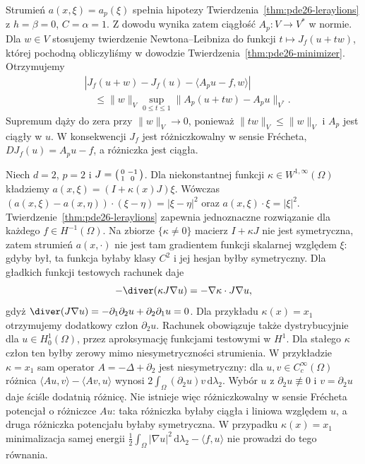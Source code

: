 \begin{uwaga}
Strumień $a(x,\xi)=a_p(\xi)$ spełnia hipotezy
Twierdzenia~\ref{thm:pde26-leraylions} z $h=\beta=0$,
$C=\alpha=1$. Z dowodu wynika zatem ciągłość
$A_p:V\to V^*$ w normie.
Dla $w\in V$ stosujemy twierdzenie Newtona--Leibniza
do funkcji $t\mapsto J_f(u+tw)$, której pochodną
obliczyliśmy w dowodzie Twierdzenia~\ref{thm:pde26-minimizer}.
Otrzymujemy
\[
 \begin{aligned}
 &|J_f(u+w)-J_f(u)-\langle A_pu-f,w\rangle|\\
 &\quad\le\|w\|_V\sup_{0\le t\le1}
                         \|A_p(u+tw)-A_pu\|_{V^*}.
 \end{aligned}
\]
Supremum dąży do zera przy $\|w\|_V\to0$, ponieważ
$\|tw\|_V\le\|w\|_V$ i $A_p$ jest ciągły w $u$.
W konsekwencji $J_f$ jest różniczkowalny w sensie
Frécheta, $DJ_f(u)=A_pu-f$, a różniczka jest ciągła.
\end{uwaga}

\begin{przyklad}
\label{ex:pde26-skewflux}
Niech $d=2$, $p=2$ i
$J=\begin{psmallmatrix}0&-1\\1&0\end{psmallmatrix}$.
Dla niekonstantnej funkcji $\kappa\in W^{1,\infty}(\Omega)$
kładziemy $a(x,\xi)=(I+\kappa(x)J)\xi$.
Wówczas $(a(x,\xi)-a(x,\eta))\cdot(\xi-\eta)
=|\xi-\eta|^2$ oraz $a(x,\xi)\cdot\xi=|\xi|^2$.
Twierdzenie~\ref{thm:pde26-leraylions} zapewnia jednoznaczne
rozwiązanie dla każdego $f\in H^{-1}(\Omega)$.
Na zbiorze $\{\kappa\ne0\}$ macierz $I+\kappa J$
nie jest symetryczna, zatem strumień $a(x,\cdot)$
nie jest tam gradientem funkcji skalarnej względem
$\xi$: gdyby był, ta funkcja byłaby klasy $C^2$
i jej hesjan byłby symetryczny.
Dla gładkich funkcji testowych rachunek daje
\[
 -\diver(\kappa J\nabla u)
 =-\nabla\kappa\cdot J\nabla u,
\]
gdyż $\diver(J\nabla u)=-\partial_1\partial_2 u
+\partial_2\partial_1 u=0$.
Dla przykładu $\kappa(x)=x_1$ otrzymujemy dodatkowy
człon $\partial_2 u$. Rachunek obowiązuje także
dystrybucyjnie dla $u\in H_0^1(\Omega)$, przez
aproksymację funkcjami testowymi w $H^1$.
Dla stałego $\kappa$ człon ten byłby zerowy mimo
niesymetryczności strumienia. W przykładzie
$\kappa=x_1$ sam operator $A=-\Delta+\partial_2$
jest niesymetryczny: dla $u,v\in C_c^\infty(\Omega)$
różnica $\langle Au,v\rangle-\langle Av,u\rangle$
wynosi $2\int_\Omega(\partial_2u)v\,\mathrm d\lambda_2$.
Wybór $u$ z $\partial_2u\not\equiv0$ i
$v=\partial_2u$ daje ściśle dodatnią różnicę.
Nie istnieje więc różniczkowalny w sensie Frécheta
potencjał o różniczce $Au$: taka różniczka byłaby
ciągła i liniowa względem $u$, a druga różniczka
potencjału byłaby symetryczna.
W przypadku $\kappa(x)=x_1$ minimalizacja samej energii
$\frac12\int_\Omega|\nabla u|^2\,\mathrm d\lambda_2
-\langle f,u\rangle$ nie prowadzi do tego równania.
\end{przyklad}



